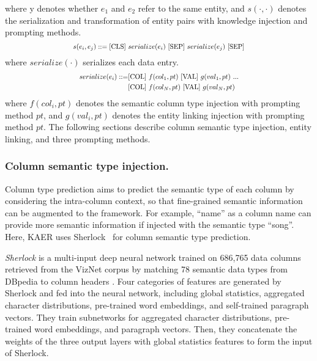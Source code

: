 where y denotes whether $e_1$ and $e_2$ refer to the same entity, and $s(\cdot,\cdot)$ denotes the serialization and transformation of entity pairs with knowledge injection and prompting methods. 
\begin{equation}
\Scale[0.8]{
    s(e_i, e_j) ::=  \text{[CLS]}\ serialize(e_i)\ \text{[SEP]}\ serialize(e_j)\ \text{[SEP]}} 
\end{equation}
where $serialize(\cdot)$ serializes each data entry.
\begin{equation}\Scale[0.8]{
\begin{split}
serialize(e_i) ::= & \text{[COL]}\ f(col_1,pt)\ \text{[VAL]}\ g(val_1,pt)\ ...\\
            & \text{[COL]}\ f(col_N,pt)\ \text{[VAL]}\ g(val_N,pt)   
\end{split}}
\end{equation}
where $f(col_i, pt)$ denotes the semantic column type injection with prompting method $pt$, and $g(val_i, pt)$ denotes the entity linking injection with prompting method $pt$. The following sections describe  column semantic type injection, entity linking, and three prompting methods.


\subsubsection{Column semantic type injection.}
Column type prediction aims to predict the semantic type of each column by considering the intra-column context, so that fine-grained semantic information can be augmented to the framework. For example, ``name'' as a column name can provide more semantic information if injected with the semantic type ``song''. Here, KAER uses Sherlock~\cite{hulsebos_sherlock_2019} for column semantic type prediction. %


\textit{Sherlock} is a multi-input deep neural network trained on 686,765 data columns retrieved from the VizNet corpus by matching 78 semantic data types from DBpedia to column headers \cite{hulsebos_sherlock_2019}. Four categories of features are generated by Sherlock and fed into the neural network, including global statistics, aggregated character distributions, pre-trained word embeddings, and self-trained paragraph vectors. They train subnetworks for aggregated character distributions, pre-trained word embeddings, and paragraph vectors. Then, they concatenate the weights of the three output layers with global statistics features to form the input of Sherlock.

